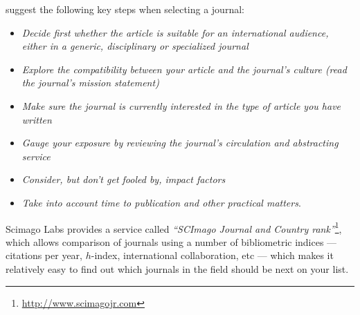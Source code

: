 \documentclass[graybox,envcountchap,sectrefs,UStrade]{svmono}
\begin{document}
\citet{Babor2008} suggest the following key steps when selecting a journal:

\begin{itemize}
  \item \emph{Decide first whether the article is suitable for an international audience, either in a generic, disciplinary or specialized journal}
  \item \emph{Explore the compatibility between your article and the journal's culture (read the journal's mission statement)}
  \item \emph{Make sure the journal is currently interested in the type of article you have written}
  \item \emph{Gauge your exposure by reviewing the journal's circulation and abstracting service}
  \item \emph{Consider, but don't get fooled by, impact factors}
  \item \emph{Take into account time to publication and other practical matters}.
\end{itemize}

\begin{figure}[!hbt]
\begin{center}
\end{center}
\end{figure}

Scimago Labs provides a service called \emph{``SCImago Journal and Country rank''}\footnote{\url{http://www.scimagojr.com}}, which allows comparison of journals using a number of bibliometric indices --- citations per year, $h$-index, international collaboration, etc --- which makes it relatively easy to find out which journals in the field should be next on your list. \par
\end{document}

